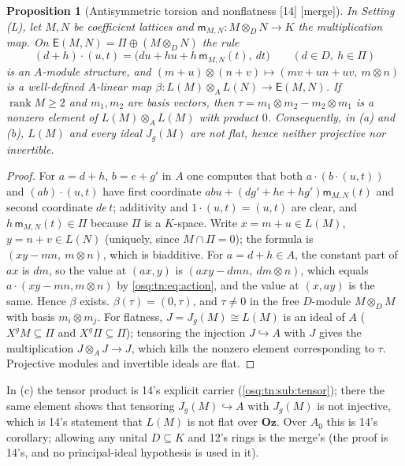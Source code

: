 \documentclass[11pt,letterpaper]{article}
\numberwithin{equation}{section}
\newtheorem{proposition}[proposition]{Proposition}
\theoremstyle{definition}
\theoremstyle{remark}
\theoremstyle{plain}
\newcommand{\Oz}{\mathbf{Oz}}
\newcommand{\rk}{\operatorname{rank}}
\newcommand{\src}[1]{\textup{\textsf{[#1]}}}
\newcommand{\merge}{\textup{\textsf{[merge]}}}
\begin{document}
\begin{proposition}[Antisymmetric torsion and nonflatness \src{14} \merge]\label{osq:tn:prop:nonflat}
In Setting (L), let $M,N$ be coefficient lattices and $\mathsf m_{M,N}:M\otimes_DN\to K$ the multiplication map. On
$\mathsf E(M,N)=\Pi\oplus(M\otimes_DN)$ the rule
\begin{equation}\label{osq:tn:eq:action}
 (d+h)\cdot(u,t)=\bigl(du+hu+h\,\mathsf m_{M,N}(t),\ dt\bigr)\qquad(d\in D,\ h\in\Pi)
\end{equation}
is an $A$-module structure, and $(m+u)\otimes(n+v)\mapsto(mv+un+uv,\ m\otimes n)$ is a well-defined $A$-linear map
$\beta:L(M)\otimes_AL(N)\to\mathsf E(M,N)$. If $\rk M\ge2$ and $m_1,m_2$ are basis vectors, then
$\tau=m_1\otimes m_2-m_2\otimes m_1$ is a nonzero element of $L(M)\otimes_AL(M)$ with product $0$. Consequently, in
(a) and (b), $L(M)$ and every ideal $J_g(M)$ are not flat, hence neither projective nor invertible.
\end{proposition}
\begin{proof}
For $a=d+h$, $b=e+g'$ in $A$ one computes that both $a\cdot(b\cdot(u,t))$ and $(ab)\cdot(u,t)$ have first coordinate
$abu+(dg'+he+hg')\mathsf m_{M,N}(t)$ and second coordinate $de\,t$; additivity and $1\cdot(u,t)=(u,t)$ are clear, and
$h\,\mathsf m_{M,N}(t)\in\Pi$ because $\Pi$ is a $K$-space. Write $x=m+u\in L(M)$, $y=n+v\in L(N)$ (uniquely, since
$M\cap\Pi=0$); the formula is $(xy-mn,\ m\otimes n)$, which is biadditive. For $a=d+h\in A$, the constant part of $ax$ is
$dm$, so the value at $(ax,y)$ is $(axy-dmn,\ dm\otimes n)$, which equals $a\cdot(xy-mn,m\otimes n)$ by
\eqref{osq:tn:eq:action}, and the value at $(x,ay)$ is the same. Hence $\beta$ exists. $\beta(\tau)=(0,\tau)$, and
$\tau\ne0$ in the free $D$-module $M\otimes_DM$ with basis $m_i\otimes m_j$. For flatness, $J=J_g(M)\cong L(M)$ is an
ideal of $A$ ($X^gM\subseteq\Pi$ and $X^g\Pi\subseteq\Pi$); tensoring the injection $J\hookrightarrow A$ with $J$ gives
the multiplication $J\otimes_AJ\to J$, which kills the nonzero element corresponding to $\tau$. Projective modules and
invertible ideals are flat.
\end{proof}

In (c) the tensor product is 14's explicit carrier (\cref{osq:tn:sub:tensor}); there the same element shows that
tensoring $J_g(M)\hookrightarrow A$ with $J_g(M)$ is not injective, which is 14's statement that $L(M)$ is not flat over
$\Oz$. Over $A_0$ this is 14's corollary; allowing any unital $D\subseteq K$ and 12's rings is the merge's (the proof is
14's, and no principal-ideal hypothesis is used in it).
\end{document}
